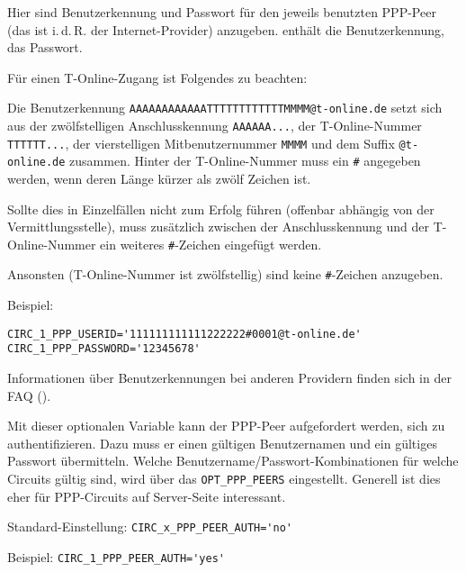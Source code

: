 \begin{description}


Hier sind Benutzerkennung und Passwort für den jeweils benutzten PPP-Peer
(das ist i.\,d.\,R. der Internet-Provider) anzugeben. 
enthält die Benutzerkennung,  das Passwort.

Für einen T-Online-Zugang ist Folgendes zu beachten:

Die Benutzerkennung \texttt{AAAAAAAAAAAATTTTTTTTTTTTMMMM@t-online.de} setzt
sich aus der zwölfstelligen Anschlusskennung \texttt{AAAAAA...}, der
T-Online-Nummer \texttt{TTTTTT...}, der vierstelligen Mitbenutzernummer
\texttt{MMMM} und dem Suffix \texttt{@t-online.de} zusammen. Hinter der
T-Online-Nummer muss ein \texttt{\#} angegeben werden, wenn deren Länge
kürzer als zwölf Zeichen ist.

Sollte dies in Einzelfällen nicht zum Erfolg führen (offenbar abhängig
von der Vermittlungsstelle), muss zusätzlich zwischen der Anschlusskennung und
der T-Online-Nummer ein weiteres \texttt{\#}-Zeichen eingefügt werden.

Ansonsten (T-Online-Nummer ist zwölfstellig) sind keine \texttt{\#}-Zeichen
anzugeben.

Beispiel:
\begin{example}
\begin{verbatim}
CIRC_1_PPP_USERID='111111111111222222#0001@t-online.de'
CIRC_1_PPP_PASSWORD='12345678'
\end{verbatim}
\end{example}

Informationen über Benutzerkennungen bei anderen Providern finden sich in der
FAQ ().


Mit dieser optionalen Variable kann der PPP-Peer aufgefordert werden, sich zu
authentifizieren. Dazu muss er einen gültigen Benutzernamen und ein gültiges
Passwort übermitteln. Welche Benutzername/Passwort-Kombinationen für welche
Circuits gültig sind, wird über das \verb+OPT_PPP_PEERS+ eingestellt. Generell
ist dies eher für PPP-Circuits auf Server-Seite interessant.

Standard-Einstellung: \verb+CIRC_x_PPP_PEER_AUTH='no'+

Beispiel: \verb+CIRC_1_PPP_PEER_AUTH='yes'+

\end{description}

